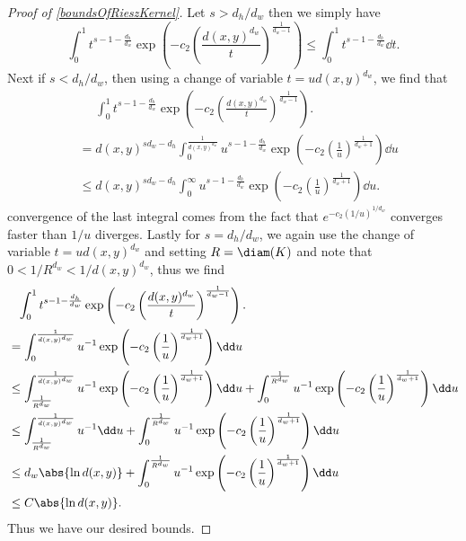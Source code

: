 \begin{proof}[Proof of \cref{boundsOfRieszKernel}]
	Let $s > d_h/d_w$ then we simply have 
	\begin{equation}
		\int_{0}^{1} t^{s-1-\frac{d_h}{d_w}} \exp\left(-c_2 \left(\frac{d(x,y)^{d_w}}{t}\right)^{\frac{1}{d_w -1}}\right) \leq \int_{0}^{1}t^{s-1-\frac{d_h}{d_w}} \dd t.
	\end{equation}
	Next if $s < d_h/d_w$, then using a change of variable $t = u d(x,y)^{d_w}$, we find that
	\begin{align}
		&\phantom{=}\int_{0}^{1} t^{s-1-\frac{d_h}{d_w}} \exp\left(-c_2 \left(\frac{d(x,y)^{d_w}}{t}\right)^{\frac{1}{d_w -1}}\right). \\
		&=d(x,y)^{sd_w - d_h} \int_{0}^{\frac{1}{d(x,y)^{d_w}}} u^{s-1-\frac{d_h}{d_w}} \exp\left(-c_2 \left(\frac{1}{u}\right)^{\frac{1}{d_w+1}}\right) \dd u \\
		&\leq d(x,y)^{sd_w-d_h} \int_{0}^{\infty} u^{s-1-\frac{d_h}{d_w}} \exp\left(-c_2 \left(\frac{1}{u}\right)^{\frac{1}{d_w+1}}\right) \dd u.
	\end{align}
	convergence of the last integral comes from the fact that $e^{-c_2(1/u)^{1/d_w}}$ converges faster than $1/u$ diverges. Lastly for $s = d_h/d_w$, we again use the change of variable $t = ud(x,y)^{d_w}$ and setting $R = \diam(K)$ and note that $0 < 1/R^{d_w} < 1/d(x,y)^{d_w}$, thus we find
	\begin{align}
		&\phantom{=}\int_{0}^{1} t^{s-1-\frac{d_h}{d_w}} \exp\left(-c_2 \left(\frac{d(x,y)^{d_w}}{t}\right)^{\frac{1}{d_w -1}}\right). \\
		&=\int_{0}^{\frac{1}{d(x,y)^{d_w}}} u^{-1} \exp\left(-c_2 \left(\frac{1}{u}\right)^{\frac{1}{d_w+1}}\right) \dd u \\
		&\leq \int_{\frac{1}{R^{d_w}}}^{\frac{1}{d(x,y)^{d_w}}} u^{-1} \exp\left(-c_2 \left(\frac{1}{u}\right)^{\frac{1}{d_w+1}}\right) \dd u + \int_{0}^{\frac{1}{R^{d_w}}} u^{-1} \exp\left(-c_2 \left(\frac{1}{u}\right)^{\frac{1}{d_w+1}}\right) \dd u  \\
		&\leq \int_{\frac{1}{R^{d_w}}}^{\frac{1}{d(x,y)^{d_w}}} u^{-1} \dd u + \int_{0}^{\frac{1}{R^{d_w}}} u^{-1} \exp\left(-c_2\left(\frac{1}{u}\right)^{\frac{1}{d_w+1}}\right) \dd u  \\
		& \leq d_w \abs{\ln d(x,y)} +\int_{0}^{\frac{1}{R^{d_w}}} u^{-1} \exp\left(-c_2\left(\frac{1}{u}\right)^{\frac{1}{d_w+1}}\right) \dd u \\
		& \leq C \abs{\ln d(x,y)}.
	\end{align}
	Thus we have our desired bounds.
\end{proof}

